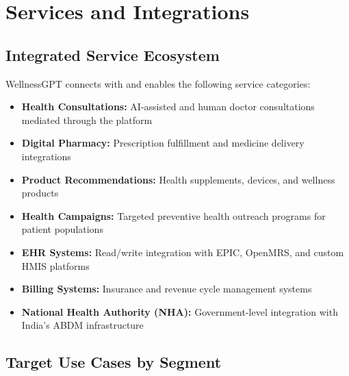 \documentclass[12pt,a4paper]{article}
\begin{document}
\newpage

\section{Services and Integrations}

\subsection{Integrated Service Ecosystem}

WellnessGPT connects with and enables the following service categories:

\begin{itemize}
    \item \textbf{Health Consultations:} AI-assisted and human doctor consultations mediated through the platform
    \item \textbf{Digital Pharmacy:} Prescription fulfillment and medicine delivery integrations
    \item \textbf{Product Recommendations:} Health supplements, devices, and wellness products
    \item \textbf{Health Campaigns:} Targeted preventive health outreach programs for patient populations
    \item \textbf{EHR Systems:} Read/write integration with EPIC, OpenMRS, and custom HMIS platforms
    \item \textbf{Billing Systems:} Insurance and revenue cycle management systems
    \item \textbf{National Health Authority (NHA):} Government-level integration with India's ABDM infrastructure
\end{itemize}

\subsection{Target Use Cases by Segment}
\end{document}
